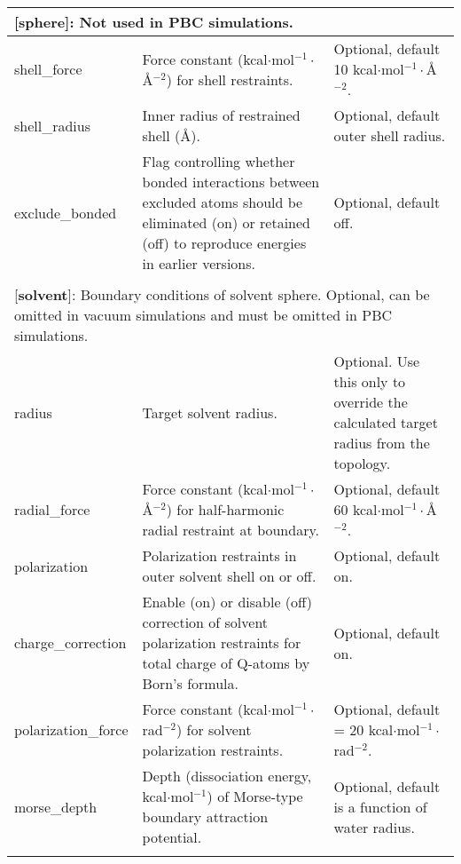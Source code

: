 \documentclass[a4paper,10pt]{article}
\begin{document}
\begin{longtable}{|p{78pt}|p{158pt}|p{158pt}|}
\multicolumn{3}{p{394pt}}{[\textbf{sphere}]: Not used in PBC simulations.}\\
\hline shell\_force & Force constant (kcal$\cdot$mol$^{-1}\cdot$\AA$^{-2}$) for shell restraints. & Optional, default 10 kcal$\cdot$mol$^{-1}\cdot$\AA$^{-2}$.\\
\hline shell\_radius & Inner radius of restrained shell (\AA). & Optional, default outer shell radius.\\
\hline exclude\_bonded & Flag controlling whether bonded interactions between excluded atoms should be eliminated (on) or retained (off) to reproduce energies in earlier versions. & Optional, default off.\\
\hline
\multicolumn{3}{p{394pt}}{}\\

\multicolumn{3}{p{394pt}}{[\textbf{solvent}]: Boundary conditions of solvent sphere. Optional, can be omitted in vacuum simulations and must be omitted in PBC simulations.}\\
\hline radius & Target solvent radius. &  Optional. Use this only to override the calculated target radius from the topology.\\
\hline radial\_force & Force constant (kcal$\cdot$mol$^{-1}\cdot$\AA$^{-2}$) for half-harmonic radial restraint at boundary. & Optional, default 60 kcal$\cdot$mol$^{-1}\cdot$\AA$^{-2}$.\\
\hline polarization & Polarization restraints in outer solvent shell on or off. & Optional, default on.\\
\hline charge\_correction &  Enable (on) or disable (off) correction of solvent polarization restraints for total charge of Q-atoms by Born's formula. & Optional, default on.\\
\hline polarization\_force & Force constant (kcal$\cdot$mol$^{-1}\cdot$rad$^{-2}$) for solvent polarization restraints. & Optional, default = 20 kcal$\cdot$mol$^{-1}\cdot$rad$^{-2}$.\\
\hline morse\_depth & Depth (dissociation energy, kcal$\cdot$mol$^{-1}$) of Morse-type boundary attraction potential. & Optional, default is a function of water radius.\\
\hline
\multicolumn{3}{p{394pt}}{}\\


\end{longtable}
\end{document}
